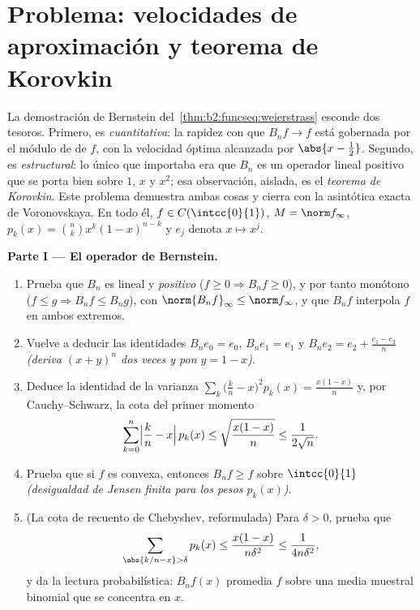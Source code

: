 \section{Problema: velocidades de aproximación y teorema de Korovkin}

\begin{problem}\label{pb:b2:funcseq:1}
La demostración de Bernstein del~\cref{thm:b2:funcseq:weierstrass} esconde dos tesoros. Primero, es
\emph{cuantitativa}: la rapidez con que $B_nf \to f$ está gobernada
por el módulo de  de $f$, con la velocidad óptima alcanzada
por $\abs{x - \frac12}$. Segundo, es \emph{estructural}: lo único
que importaba era que $B_n$ es un operador lineal positivo que se
porta bien sobre $1$, $x$ y $x^2$; esa observación, aislada, es el
\emph{teorema de Korovkin}. Este problema
demuestra ambas cosas y cierra con la asintótica exacta de
Voronovskaya. En todo él, $f \in C(\intcc{0}{1})$, $M = \norm
f_\infty$, $p_k(x) = \binom nk x^k(1-x)^{n-k}$ y $e_j$ denota $x
\mapsto x^j$.

\medskip
\noindent\textbf{Parte I --- El operador de Bernstein.}
\begin{enumerate}
  \item Prueba que $B_n$ es lineal y \emph{positivo} ($f \geq 0
        \Rightarrow B_nf \geq 0$), y por tanto monótono ($f \leq g
        \Rightarrow B_nf \leq B_ng$), con $\norm{B_nf}_\infty \leq
        \norm f_\infty$, y que $B_nf$ interpola $f$ en ambos
        extremos.
  \item Vuelve a deducir las identidades $B_n e_0 = e_0$, $B_n e_1
        = e_1$ y $B_n e_2 = e_2 + \frac{e_1 - e_2}{n}$
        \emph{(deriva $(x + y)^n$ dos veces y pon $y = 1 - x$)}.
  \item Deduce la identidad de la varianza $\sum_k \bigl(\frac kn -
        x\bigr)^2 p_k(x) = \frac{x(1-x)}{n}$ y, por
        Cauchy--Schwarz, la cota del primer momento
        \[
        \sum_{k=0}^{n}\Bigl|\frac kn - x\Bigr|\,p_k(x)
        \leq \sqrt{\frac{x(1-x)}{n}} \leq \frac{1}{2\sqrt n} .
        \]
  \item Prueba que si $f$ es convexa, entonces $B_nf \geq f$ sobre
        $\intcc{0}{1}$ \emph{(desigualdad de Jensen finita para los
        pesos $p_k(x)$)}.
  \item (La cota de recuento de Chebyshev, reformulada) Para
        $\delta > 0$, prueba que
        \[
        \sum_{\abs{k/n - x} > \delta} p_k(x)
        \leq \frac{x(1-x)}{n\delta^2}
        \leq \frac{1}{4n\delta^2} ,
        \]
        y da la lectura probabilística: $B_nf(x)$ promedia $f$ sobre
        una media muestral binomial que se concentra en $x$.
\end{enumerate}


\end{problem}
